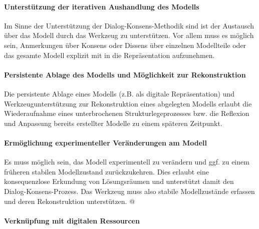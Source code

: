 
\paragraph{Unterstützung der iterativen Aushandlung des Modells} %
\label{par:unterstützung_der_iterativen_aushandlung_des_modells}

Im Sinne der Unterstützung der Dialog-Konsens-Methodik sind ist der Austausch über das Modell durch das Werkzeug zu unterstützen. Vor allem muss es möglich sein, Anmerkungen über Konsens oder Dissens über einzelnen Modellteile oder das gesamte Modell explizit mit in die Repräsentation aufzunehmen. 


\paragraph{Persistente Ablage des Modells und Möglichkeit zur Rekonstruktion} %
\label{par:persistente_ablage_des_modells_möglichkeit_zur_rekonstruktion}

Die persistente Ablage eines Modells (z.B. als digitale Repräsentation) und Werkzeugunterstützung zur Rekonstruktion eines abgelegten Modells erlaubt die Wiederaufnahme eines unterbrochenen Strukturlegeprozesses bzw. die Reflexion und Anpassung bereits erstellter Modelle zu einem späteren Zeitpunkt.


\paragraph{Ermöglichung experimenteller Veränderungen am Modell} %
\label{par:ermöglichung_experimenteller_veränderungen_am_modell}

Es muss möglich sein, das Modell experimentell zu verändern und ggf. zu einem früheren stabilen Modellzustand zurückzukehren. Dies erlaubt eine konsequenzlose Erkundung von Lösungsräumen und unterstützt damit den Dialog-Konsens-Prozess. Das Werkzeug muss also stabile Modellzustände erfassen und deren Rekonstruktion unterstützen.
@

\paragraph{Verknüpfung mit digitalen Ressourcen} %
\label{par:verknüpfung_mit_digitalen_ressourcen}

